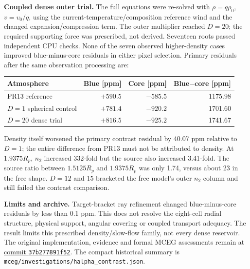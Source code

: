 \documentclass[10pt,a4paper]{article}
\begin{document}
\textbf{Coupled dense outer trial.}
The full equations were re-solved with $\rho=q\rho_0$, $v=v_0/q$, using the
current-temperature/composition reference wind and the changed
expansion/compression term. The outer multiplier reached
$D=20$; the required supporting force was prescribed, not derived.
Seventeen roots passed independent CPU checks. None of the seven observed
higher-density cases improved blue-minus-core residuals in either pixel
selection. Primary residuals after the same observation processing are:
\begin{center}
\begin{tabular}{lrrr}
\toprule
Atmosphere & Blue [ppm] & Core [ppm] & Blue$-$core [ppm] \\
\midrule
PR13 reference & $+590.5$ & $-585.5$ & 1175.98 \\
$D=1$ spherical control & $+781.4$ & $-920.2$ & 1701.60 \\
$D=20$ dense trial & $+816.5$ & $-925.2$ & 1741.67 \\
\bottomrule
\end{tabular}
\end{center}
Density itself worsened the primary contrast residual by 40.07 ppm relative
to $D=1$; the entire difference from PR13 must not be attributed to density.
At $1.9375R_p$, $n_2$ increased 332-fold but the source also increased
3.41-fold. The source ratio between $1.5125R_p$ and $1.9375R_p$ was only
1.74, versus about 23 in the free shape. $D=12$ and 15 bracketed the free
model's outer $n_2$ column and still failed the contrast comparison.

\textbf{Limits and archive.}
Target-bracket ray refinement changed blue-minus-core residuals by less than
0.1 ppm. This does not resolve the eight-cell radial structure, physical
support, angular covering or coupled transport adequacy. The result limits
this prescribed density/slow-flow family, not every dense reservoir.
The original implementation, evidence and formal MCEG assessments remain at
\href{https://github.com/HajimeKawahara/exojax-escape/tree/37b277891f5232e9cb8fd1950879952f1adf49d0}{commit \texttt{37b277891f52}}.
The compact historical summary is
\texttt{mceg/investigations/halpha\_contrast.json}.
\end{document}
